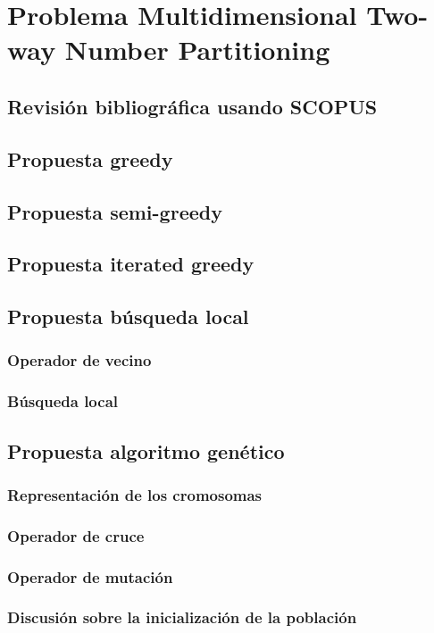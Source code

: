\section{Problema Multidimensional Two-way Number Partitioning}

\subsection{Revisión bibliográfica usando SCOPUS}

\subsection{Propuesta greedy}

\subsection{Propuesta semi-greedy}

\subsection{Propuesta iterated greedy}

\subsection{Propuesta búsqueda local}

\subsubsection{Operador de vecino}

\subsubsection{Búsqueda local}



\subsection{Propuesta algoritmo genético}

\subsubsection{Representación de los cromosomas}

\subsubsection{Operador de cruce}

\subsubsection{Operador de mutación}

\subsubsection{Discusión sobre la inicialización de la población}
